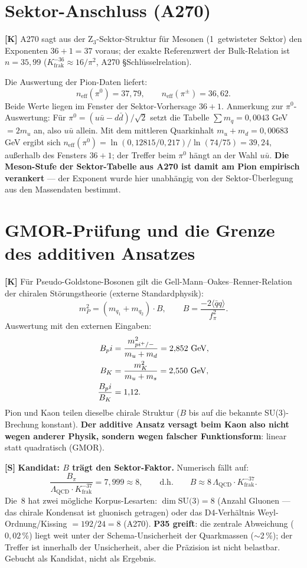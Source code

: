 \section{Sektor-Anschluss (A270)}

\textbf{[K]} A270 sagt aus der Z$_3$-Sektor-Struktur für Mesonen
(1~getwisteter Sektor) den Exponenten $36+1 = 37$ voraus; der exakte
Referenzwert der Bulk-Relation ist $n = 35{,}99$
($K_\text{frak}^{-36} \approx 16/\pi^2$, A270 \S{}Schlüsselrelation).

Die Auswertung der Pion-Daten liefert:
\[
  n_\text{eff}(\pi^0) = 37{,}79, \qquad n_\text{eff}(\pi^\pm) = 36{,}62.
\]
Beide Werte liegen im Fenster der Sektor-Vorhersage $36+1$.
Anmerkung zur $\pi^0$-Auswertung: Für $\pi^0=(u\bar u-d\bar d)/\sqrt2$ setzt
die Tabelle $\sum m_q=0{,}0043$ GeV $=2m_u$ an, also $u\bar u$ allein. Mit dem
mittleren Quarkinhalt $m_u+m_d=0{,}00683$ GeV ergibt sich
$n_\text{eff}(\pi^0)=\ln(0{,}12815/0{,}217)/\ln(74/75)=39{,}24$, außerhalb des
Fensters $36+1$; der Treffer beim $\pi^0$ hängt an der Wahl $u\bar u$.
\textbf{Die Meson-Stufe der Sektor-Tabelle aus A270 ist damit am Pion
empirisch verankert} --- der Exponent wurde hier unabhängig von der
Sektor-Überlegung aus den Massendaten bestimmt.

\section{GMOR-Prüfung und die Grenze des additiven Ansatzes}

\textbf{[K]} Für Pseudo-Goldstone-Bosonen gilt die
Gell-Mann--Oakes--Renner-Relation der chiralen Störungstheorie
(externe Standardphysik):
\[
  m_P^2 = (m_{q_1} + m_{q_2})\cdot B,
  \qquad B = \frac{-2\langle\bar qq\rangle}{f_\pi^2}.
\]
Auswertung mit den externen Eingaben:
\begin{align}
  B_\pi &= \frac{m_{\pi^\pm}^2}{m_u+m_d} = 2{,}852\ \text{GeV}, \notag\\
  B_K   &= \frac{m_K^2}{m_u+m_s}         = 2{,}550\ \text{GeV}, \notag\\
  \frac{B_\pi}{B_K} &= 1{,}12. \notag
\end{align}
Pion und Kaon teilen dieselbe chirale Struktur ($B$ bis auf die bekannte
SU(3)-Brechung konstant). \textbf{Der additive Ansatz versagt beim Kaon
also nicht wegen anderer Physik, sondern wegen falscher Funktionsform}:
linear statt quadratisch (GMOR).

\medskip
\textbf{[S]} \textbf{Kandidat: $B$ trägt den Sektor-Faktor.}
Numerisch fällt auf:
\[
  \frac{B_\pi}{\Lambda_\text{QCD}\cdot K_\text{frak}^{-37}}
  = 7{,}999 \approx 8,
  \qquad\text{d.h.}\qquad
  B \approx 8\,\Lambda_\text{QCD}\cdot K_\text{frak}^{-37}.
\]
Die~8 hat zwei mögliche Korpus-Lesarten: $\dim\text{SU(3)} = 8$
(Anzahl Gluonen --- das chirale Kondensat ist gluonisch getragen) oder
das D4-Verhältnis Weyl-Ordnung/Kissing $= 192/24 = 8$ (A270).
\textbf{P35 greift}: die zentrale Abweichung ($0{,}02\,\%$) liegt weit
unter der Schema-Unsicherheit der Quarkmassen ($\sim$2\,\%); der
Treffer ist innerhalb der Unsicherheit, aber die Präzision ist nicht
belastbar. Gebucht als Kandidat, nicht als Ergebnis.

